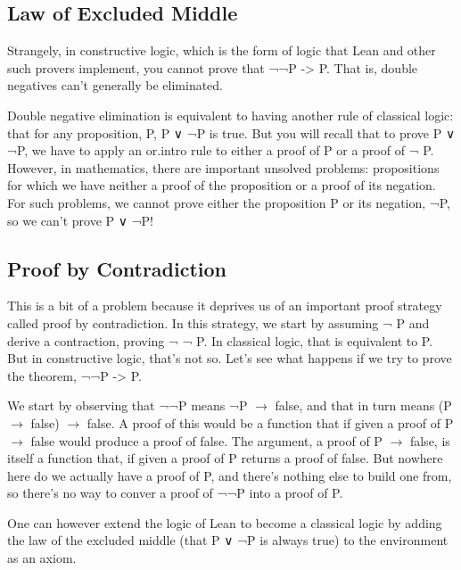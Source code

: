 \documentclass[letterpaper,10pt,english]{sphinxmanual}
\begin{document}
\subsection{Law of Excluded Middle}
\label{\detokenize{15-proofs:law-of-excluded-middle}}
Strangely, in constructive logic, which is the form of logic that Lean
and other such provers implement, you cannot prove that ¬¬P -\textgreater{} P. That
is, double negatives can’t generally be eliminated.

Double negative elimination is equivalent to having another rule of
classical logic: that for any proposition, P, P ∨ ¬P is true.  But you
will recall that to prove P ∨ ¬P, we have to apply an or.intro rule to
either a proof of P or a proof of ¬ P. However, in mathematics, there
are important unsolved problems: propositions for which we have
neither a proof of the proposition or a proof of its negation. For
such problems, we cannot prove either the proposition P or its
negation, ¬P, so we can’t prove P ∨ ¬P!


\subsection{Proof by Contradiction}
\label{\detokenize{15-proofs:proof-by-contradiction}}
This is a bit of a problem because it deprives us of an important
proof strategy called proof by contradiction. In this strategy, we
start by assuming ¬ P and derive a contraction, proving ¬ ¬ P. In
classical logic, that is equivalent to P.  But in constructive logic,
that’s not so.  Let’s see what happens if we try to prove the theorem,
¬¬P -\textgreater{} P.

We start by observing that ¬¬P means ¬P \(\rightarrow\) false, and that in turn
means (P \(\rightarrow\) false) \(\rightarrow\) false. A proof of this would be a function that if
given a proof of P \(\rightarrow\) false would produce a proof of false. The
argument, a proof of P \(\rightarrow\) false, is itself a function that, if given a
proof of P returns a proof of false. But nowhere here do we actually
have a proof of P, and there’s nothing else to build one from, so
there’s no way to conver a proof of ¬¬P into a proof of P.

One can however extend the logic of Lean to become a classical logic
by adding the law of the excluded middle (that P ∨ ¬P is always true)
to the environment as an axiom.

\begin{sphinxVerbatim}[commandchars=\\\{\}]
      
\end{sphinxVerbatim}
\end{document}
